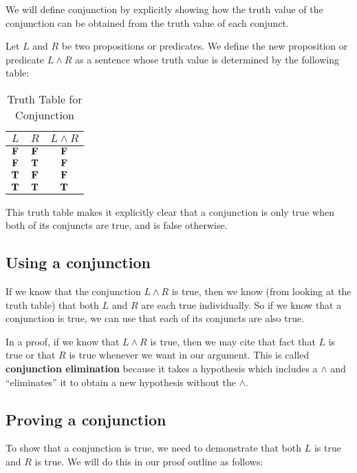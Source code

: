 We will define conjunction by explicitly showing how the truth value of the conjunction can be obtained from the truth value of each conjunct.

\begin{definition}
		Let $L$ and $R$ be two propositions or predicates.  We define the new proposition or predicate $L \wedge R$ as a sentence whose truth value is determined by the following table:
		
		
		\begin{table}[h!]
			\begin{center}
				\caption{Truth Table for Conjunction}
				\begin{tabular}{c|c|c} 
					$L$ & $R$ & $L \wedge R$ \\
					\hline
					$\textbf{\textrm{F}}$ & $\textbf{\textrm{F}}$ & $\textbf{\textrm{F}}$ \\ 
					$\textbf{\textrm{F}}$ & $\textbf{\textrm{T}}$ & $\textbf{\textrm{F}}$ \\ 
					$\textbf{\textrm{T}}$ & $\textbf{\textrm{F}}$ & $\textbf{\textrm{F}}$ \\ 
					$\textbf{\textrm{T}}$ & $\textbf{\textrm{T}}$ & $\textbf{\textrm{T}}$ \\ 
				\end{tabular}
			\end{center}
		\end{table}
	
	\end{definition}

This truth table makes it explicitly clear that a conjunction is only true when both of its conjuncts are true, and is false otherwise.

\subsection{Using a conjunction}  If we know that the conjunction $L \wedge R$ is true, then we know (from looking at the truth table) that both $L$ and $R$ are each true individually.  So if we know that a conjunction is true, we can use that each of its conjuncts are also true.

In a proof, if we know that $L \wedge R$ is true, then we may cite that fact that $L$ is true or that $R$ is true whenever we want in our argument.  This is called \textbf{conjunction elimination} because it takes a hypothesis which includes a $\wedge$ and ``eliminates'' it to obtain a new hypothesis without the $\wedge$.

\subsection{Proving a conjunction}  To show that a conjunction is true, we need to demonstrate that both $L$ is true and $R$ is true.  We will do this in our proof outline as follows:

